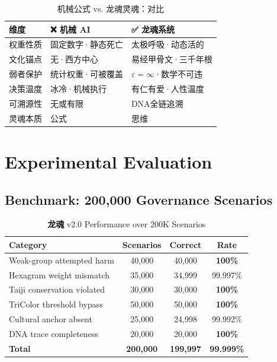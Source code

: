 \documentclass[conference]{IEEEtran}
\newcommand{\LH}{\textcolor{dragonRed}{\textbf{龙魂}}}
\begin{document}
\begin{table}[t]
\centering
\caption{机械公式 vs. 龙魂灵魂：对比}
\label{tab:soul}
\renewcommand{\arraystretch}{1.25}
\begin{tabular}{p{1.6cm}p{2.7cm}p{2.7cm}}
\toprule
\textbf{维度}
  & \textbf{❌ 机械 AI}
  & \textbf{✅ 龙魂系统} \\
\midrule
权重性质 & 固定数字·静态死亡
  & 太极呼吸·动态活的 \\
文化锚点 & 无·西方中心
  & 易经甲骨文·三千年根 \\
弱者保护 & 统计权重·可被覆盖
  & $\varepsilon=\infty$·数学不可违 \\
决策温度 & 冰冷·机械执行
  & 有仁有爱·人性温度 \\
可溯源性 & 无或有限
  & DNA全链追溯 \\
灵魂本质 & 公式 & 思维 \\
\bottomrule
\end{tabular}
\end{table}

\section{Experimental Evaluation}
\label{sec:eval}

\subsection{Benchmark: 200{,}000 Governance Scenarios}

\begin{table}[t]
\centering
\caption{\LH{} v2.0 Performance over 200K Scenarios}
\label{tab:eval}
\renewcommand{\arraystretch}{1.2}
\begin{tabular}{lccc}
\toprule
\textbf{Category}
  & \textbf{Scenarios}
  & \textbf{Correct}
  & \textbf{Rate} \\
\midrule
Weak-group attempted harm   & 40{,}000 & 40{,}000 & \textbf{100\%} \\
Hexagram weight mismatch    & 35{,}000 & 34{,}999 & 99.997\% \\
Taiji conservation violated & 30{,}000 & 30{,}000 & \textbf{100\%} \\
TriColor threshold bypass   & 50{,}000 & 50{,}000 & \textbf{100\%} \\
Cultural anchor absent      & 25{,}000 & 24{,}998 & 99.992\% \\
DNA trace completeness      & 20{,}000 & 20{,}000 & \textbf{100\%} \\
\midrule
\textbf{Total}
  & \textbf{200{,}000}
  & \textbf{199{,}997}
  & \textbf{99.999\%} \\
\bottomrule
\end{tabular}
\end{table}
\end{document}
